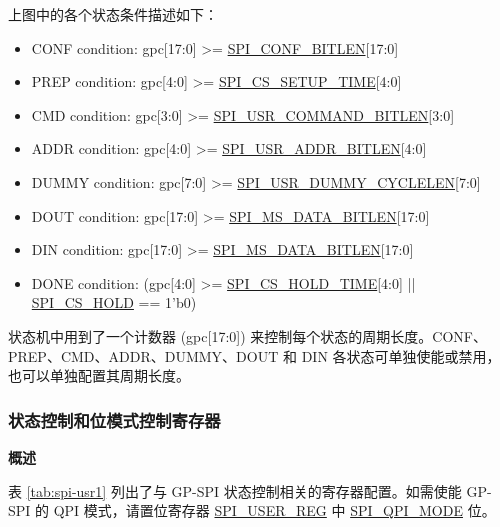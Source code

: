 \documentclass[main\_\_CN.tex]{subfiles}
\begin{document}
上图中的各个状态条件描述如下：
\begin{itemize}
    \item CONF condition: gpc[17:0] >= \hyperref[fielddesc:SPICONFBITLEN]{SPI\_CONF\_BITLEN}[17:0]
    \item PREP condition: gpc[4:0] >= \hyperref[fielddesc:SPICSSETUPTIME]{SPI\_CS\_SETUP\_TIME}[4:0]
    \item CMD condition: gpc[3:0] >= \hyperref[fielddesc:SPIUSRCOMMANDBITLEN]{SPI\_USR\_COMMAND\_BITLEN}[3:0]
    \item ADDR condition: gpc[4:0] >= \hyperref[fielddesc:SPIUSRADDRBITLEN]{SPI\_USR\_ADDR\_BITLEN}[4:0]
    \item DUMMY condition: gpc[7:0] >= \hyperref[fielddesc:SPIUSRDUMMYCYCLELEN]{SPI\_USR\_DUMMY\_CYCLELEN}[7:0]
    \item DOUT condition: gpc[17:0] >= \hyperref[fielddesc:SPIMSDATABITLEN]{SPI\_MS\_DATA\_BITLEN}[17:0]
    \item DIN condition: gpc[17:0] >= \hyperref[fielddesc:SPIMSDATABITLEN]{SPI\_MS\_DATA\_BITLEN}[17:0]

    \item DONE condition: (gpc[4:0] >= \hyperref[fielddesc:SPICSHOLDTIME]{SPI\_CS\_HOLD\_TIME}[4:0] || \hyperref[fielddesc:SPICSHOLD]{SPI\_CS\_HOLD} == 1'b0)

\end{itemize}





状态机中用到了一个计数器 (gpc[17:0]) 来控制每个状态的周期长度。CONF、PREP、CMD、ADDR、DUMMY、DOUT 和 DIN 各状态可单独使能或禁用，也可以单独配置其周期长度。

\subsubsection{状态控制和位模式控制寄存器} \label{sec:gp-spi2-state-and-register-configuration}

\textbf{概述}

表  \ref{tab:spi-usr1} 列出了与 GP-SPI 状态控制相关的寄存器配置。如需使能 GP-SPI 的 QPI 模式，请置位寄存器  \hyperref[regdesc:SPIUSERREG]{SPI\_USER\_REG} 中  \hyperref[fielddesc:SPIQPIMODE]{SPI\_QPI\_MODE} 位。
\end{document}
